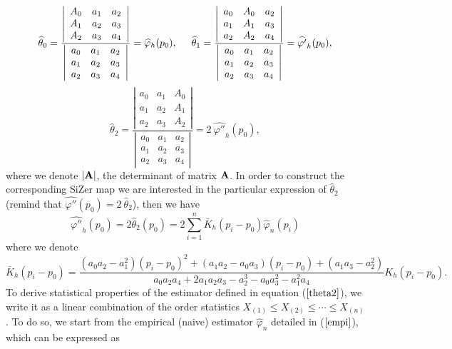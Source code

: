 \documentclass[preprint,12pt]{elsarticle}
\begin{document}
\[
\widehat{\theta}_0=\frac{\left|
\begin{array}{ccc} 
A_0 & a_1 &a_2 \\ 
A_1 & a_2 &a_3 \\ 
A_2 & a_3 &a_4
 \end{array}\right|}
 {\left|\begin{array}{ccc} 
a_0 & a_1 &a_2 \\
 a_1 & a_2 &a_3 \\
 a_2 & a_3 &a_4
 \end{array}\right|}=\widehat{\varphi}_h(p_0),
\hspace{0.5cm}
\widehat{\theta}_1=\frac{\left|
\begin{array}{ccc} 
a_0 & A_0 &a_2 \\
 a_1 & A_1 & a_3 \\ 
a_2 & A_2 &a_4
 \end{array}\right|}
{\left|\begin{array}{ccc} 
a_0 & a_1 &a_2 \\ 
a_1 & a_2 &a_3 \\ 
a_2 & a_3 &a_4
 \end{array}\right|}=\widehat{\varphi'}_h(p_0),
\]
\[
\widehat{\theta}_2=\frac{\left|
\begin{array}{ccc} 
a_0 & a_1 & A_0 \\
 a_1 & a_2 &A_1 \\ 
a_2 & a_3 &A_2
 \end{array}\right|}
{\left|\begin{array}{ccc}
a_0 & a_1 &a_2 \\
 a_1 & a_2 &a_3 \\ 
a_2 & a_3 &a_4
 \end{array}\right|}=2 \ \widehat{\varphi''}_h(p_0),
\]
where we denote $|{\bf A}|$, the determinant of matrix ${\bf A}$. In order to construct the corresponding SiZer map we are interested in the particular expression of $\widehat{\theta}_2$ (remind that $\widehat{\varphi''}(p_0)=2 \ \widehat{\theta}_2$), then we have
\begin{equation}\label{theta2}
\widehat{\varphi''}_h(p_0)= 2 \widehat{\theta}_2(p_0) =2 \sum_{i=1}^n \bar{{K}}_h\left(p_i-p_0\right) \widehat{\varphi}_n(p_i)
\end{equation}
where we denote
\[
\bar{{K}}_h\left(p_i-p_0\right)=\frac{\left(a_0a_2-a_1^2\right)\left(p_i-p_0\right)^2+\left(a_1a_2-a_0a_3\right)\left(p_i-p_0\right)+\left(a_1a_3-a_2^2\right)}{a_0a_2a_4+2a_1a_2a_3-a_2^3-a_0a_3^2-a_1^2a_4} K_h\left(p_i-p_0\right).
\]
To derive statistical properties of the estimator defined in equation ($\ref{theta2}$), we write it as a linear combination of the order statistics $X_{(1)} \leq X_{(2)} \leq \cdots \leq X_{(n)}$. To do so, we start from the empirical (naive) estimator $\widehat{\varphi}_n$ detailed in ($\ref{empi}$), which can be expressed as
\end{document}
